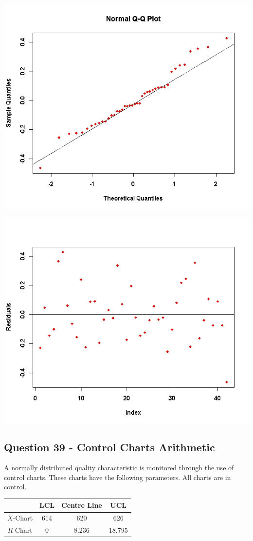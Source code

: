 \documentclass[a4paper,12pt]{article}
\begin{document}
\begin{center}
	\includegraphics[scale=0.55]{images/ExamQ5qqplot}
\end{center}
\begin{center}
	\includegraphics[scale=0.55]{images/ExamQ5resid}
\end{center}
\newpage



\subsection*{Question 39 - Control Charts Arithmetic}
A normally distributed quality characteristic is monitored through the use of control charts. These charts have the following parameters. All charts are in control.
	\begin{center}
		\begin{tabular}{|c|c|c|c|}
			\hline  & LCL & Centre Line & UCL \\
			\hline $\bar{X}$-Chart & 614 & 620 & 626 \\
			\hline $R$-Chart & 0 & 8.236 & 18.795 \\ \hline
		\end{tabular}
	\end{center}
	
\end{document}
